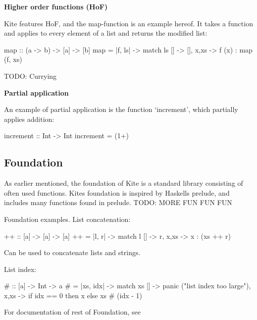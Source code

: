 \textbf{Higher order functions (HoF)}

Kite features HoF, and the map-function is an example hereof. It takes a function and applies to every element of a list and returns the modified list:

\begin{kite}

map :: (a -> b) -> [a] -> [b]
map = |f, ls| -> {
  match ls {
    [] -> [],
    x,xs -> f (x) : map (f, xs)
  }
}
\end{kite}

TODO: Currying

\textbf{Partial application}

An example of partial application is the function `increment', which partially applies addition:

\begin{kite}

increment :: Int -> Int
increment = (1+)

\end{kite}




\subsection{Foundation}

As earlier mentioned, the foundation of Kite is a standard library
consisting of often used functions. Kites foundation is inspired by
Haskells prelude, and includes many functions found in
prelude. 
TODO: MORE FUN FUN FUN

Foundation examples.
List concatenation:
\begin{kite}

  {++} :: [a] -> [a] -> [a]
  {++} = |l, r| -> {
    match l {
      [] -> r,
      x,xs -> x : (xs ++ r)
    }
  }
\end{kite}
Can be used to concatenate lists and strings.

List index:
\begin{kite}

  {#} :: [a] -> Int -> a
  {#} = |xs, idx| -> {
    match xs {
      [] -> panic ("list index too large"),
      x,xs -> if idx == 0 then x else xs # (idx - 1)
    }
  }
\end{kite}

For documentation of rest of Foundation, see 
